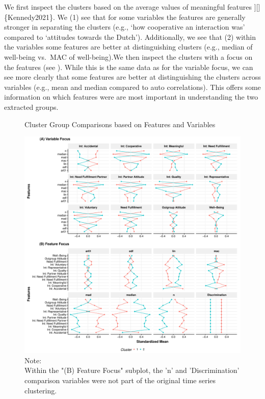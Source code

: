 We first inspect the clusters based on the average values of meaningful
features
\citep[see \fgrref[A]{fig:clusterFeatVar}{]}{[}{]}\{Kennedy2021\}. We
(1) see that for some variables the features are generally stronger in
separating the clusters (e.g., `how cooperative an interaction was'
compared to `attitudes towards the Dutch'). Additionally, we see that
(2) within the variables some features are better at distinguishing
clusters (e.g., median of well-being vs.~MAC of well-being).We then
inspect the clusters with a focus on the features (see
). While this is the same data as for the
variable focus, we can see more clearly that some features are better at
distinguishing the clusters across variables (e.g., mean and median
compared to auto correlations). This offers some information on which
features were are most important in understanding the two extracted
groups.

\begin{figure}[!ht] %
  \caption{Cluster Group Comparisons based on Features and Variables}
  \label{fig:clusterFeatVar}
  \centering\includegraphics[width=\textwidth]{figures/clusterFeatVarComb.pdf}
  \caption*{Note: \\
  Within the "(B) Feature Focus" subplot, the 'n' and 'Discrimination' comparison variables were not part of the original time series clustering.}
\end{figure}

